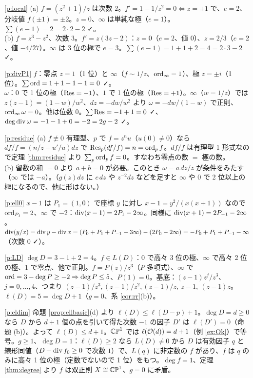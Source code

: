 \begin{sol}{\ref{p:local}}
(a) $f=(z^2+1)/z$ は次数 $2$。$f'=1-1/z^2=0\iff z=\pm1$ で、$e=2$、分岐値 $f(\pm1)=\pm2$。$z=0$、$\infty$ は単純な極（$e=1$）。$\sum(e-1)=2=2\cdot2-2$ ✓。\\
(b) $f=z^3-z^2$、次数 $3$。$f'=z(3z-2)$：$z=0$（$e=2$、値 $0$）、$z=2/3$（$e=2$、値 $-4/27$）。$\infty$ は 3 位の極で $e=3$。$\sum(e-1)=1+1+2=4=2\cdot3-2$ ✓。
\end{sol}
\begin{sol}{\ref{p:divP1}}
$f$：零点 $z=1$（1 位）と $\infty$（$f\sim1/z$、$\operatorname{ord}_\infty=1$）、極 $z=\pm i$（1 位）。$\sum\operatorname{ord}=1+1-1-1=0$ ✓。\\
$\omega$：$0$ で 1 位の極（$\operatorname{Res}=-1$）、$1$ で 1 位の極（$\operatorname{Res}=+1$）。$\infty$（$w=1/z$）では $z(z-1)=(1-w)/w^2$、$dz=-dw/w^2$ より $\omega=-dw/(1-w)$ で正則、$\operatorname{ord}_\infty\omega=0$。他は位数 $0$。$\sum\operatorname{Res}=-1+1=0$ ✓、$\deg\operatorname{div}\omega=-1-1+0=-2=2g-2$ ✓。
\end{sol}
\begin{sol}{\ref{p:residue}}
(a) $f\not\equiv0$ 有理型、$p$ で $f=z^nu$（$u(0)\ne0$）なら $df/f=(n/z+u'/u)dz$ で $\operatorname{Res}_p(df/f)=n=\operatorname{ord}_pf$。$df/f$ は有理型 1 形式なので定理 \ref{thm:residue} より $\sum_p\operatorname{ord}_pf=0$。すなわち零点の数 $=$ 極の数。\\
(b) 留数の和 $=0$ より $a+b=0$ が必要。このとき $\omega=a\,dz/z$ が条件をみたす（$\infty$ では $-a$）。（$g(z)dz$ に $c\,dz$ や $z^{-2}dz$ などを足すと $\infty$ や $0$ で 2 位以上の極になるので、他に形はない。）
\end{sol}
\begin{sol}{\ref{p:ell0}}
$x-1$ は $P_1=(1,0)$ で座標 $y$ に対し $x-1=y^2/(x(x+1))$ なので $\operatorname{ord}_{P_1}=2$、$\infty$ で $-2$：$\operatorname{div}(x-1)=2P_1-2\infty$。同様に $\operatorname{div}(x+1)=2P_{-1}-2\infty$。$\operatorname{div}(y/x)=\operatorname{div} y-\operatorname{div} x=(P_0+P_1+P_{-1}-3\infty)-(2P_0-2\infty)=-P_0+P_1+P_{-1}-\infty$（次数 $0$ ✓）。
\end{sol}
\begin{sol}{\ref{p:LD}}
$\deg D=3-1+2=4$。$f\in L(D)$：$0$ で高々 3 位の極、$\infty$ で高々 2 位の極、$1$ で零点、他で正則。$f=P(z)/z^3$（$P$ 多項式）、$\infty$ で $\operatorname{ord}=3-\deg P\ge-2\Rightarrow\deg P\le5$、$P(1)=0$。基底：$(z-1)z^j/z^3$、$j=0,\dots,4$、つまり $(z-1)/z^3,(z-1)/z^2,(z-1)/z,\ z-1,\ (z-1)z$。$\ell(D)=5=\deg D+1$（$g=0$、系 \ref{cor:rr}(b)）。
\end{sol}
\begin{sol}{\ref{p:eldim}}
命題 \ref{prop:ellbasic}(d) より $\ell(D)\le\ell(D-p)+1$。$\deg D=d\ge0$ なら $D$ から $d+1$ 個の点を引いて得た次数 $-1$ の因子 $D'$ は $\ell(D')=0$（命題 (b)）。よって $\ell(D)\le d+1$。$\mathbb{CP}^1$ では $\ell(\mathcal O(d))=d+1$（例 \ref{ex:Ok}）で等号。$g\ge1$、$\deg D=1$：$\ell(D)\ge2$ なら $L(D)\ne0$ から $D$ は有効因子 $q$ と線形同値（$D+\operatorname{div} f_0\ge0$ で次数 $1$）で、$L(q)$ に非定数の $f$ があり、$f$ は $q$ のみに高々 1 位の極（定数でないので 1 位）をもつ。$\deg f=1$、定理 \ref{thm:degree} より $f$ は双正則 $X\cong\mathbb{CP}^1$、$g=0$ に矛盾。
\end{sol}
